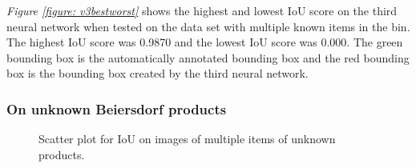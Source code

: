 \textit{Figure \ref{figure: v3bestworst}} shows the highest and lowest IoU score on the third neural network when tested on the data set with multiple known items in the bin. The highest IoU score was 0.9870 and the lowest IoU score was 0.000. The green bounding box is the automatically annotated bounding box and the red bounding box is the bounding box created by the third neural network.



\clearpage
\subsubsection{On unknown Beiersdorf products}\label{subsec:v3resunknownprod}

\begin{figure}[h]
 \centering
 \hfill
 \caption{Scatter plot for IoU on images of multiple items of unknown products.}
 \label{figure: v3unknownproducts}
\end{figure}

